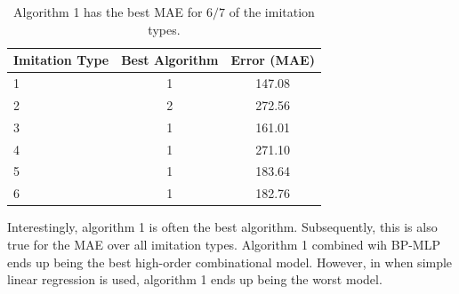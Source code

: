 \begin{table}[center]
	\centering
	\begin{center}
		\begin{tabular}{|l|c|c|} \hline
			\textbf{Imitation Type}	& \textbf{Best Algorithm}	&	\textbf{Error (MAE)}	\\ \hline \hline
			1						& 1							&	147.08					\\ \hline
			2						& 2							&	272.56					\\ \hline
			3						& 1							&	161.01					\\ \hline
			4						& 1							&	271.10					\\ \hline
			5						& 1							&	183.64					\\ \hline
			6						& 1							&	182.76					\\ \hline
		\end{tabular}
	\end{center}
	\caption{Algorithm 1 has the best MAE for $6/7$ of the imitation types.}
	\label{tab:best-for-each}
\end{table}

Interestingly, algorithm 1 is often the best algorithm. Subsequently, this is also true for the MAE over all imitation types. Algorithm 1 combined wih BP-MLP ends up being the best high-order combinational model. However, in when simple linear regression is used, algorithm 1 ends up being the worst model.


